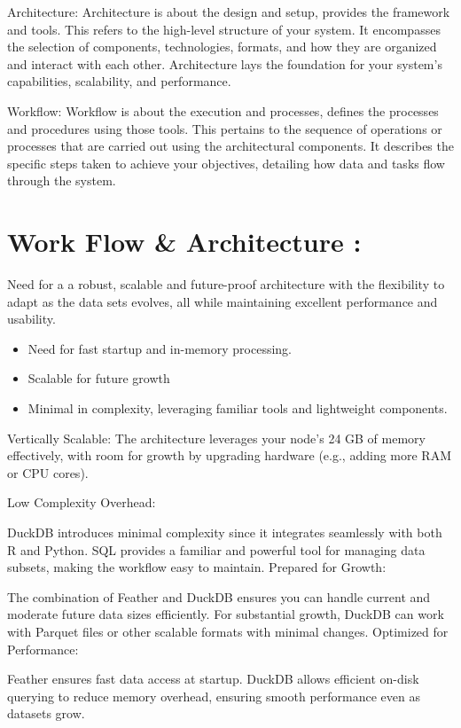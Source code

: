 \documentclass[
  american,
  10,
  a4paper,
]{book}
\providecommand{\tightlist}{%
  \setlength{\itemsep}{0pt}\setlength{\parskip}{0pt}}
\theoremstyle{definition}
\theoremstyle{remark}
\begin{document}
Architecture: Architecture is about the design and setup, provides the
framework and tools. This refers to the high-level structure of your
system. It encompasses the selection of components, technologies,
formats, and how they are organized and interact with each other.
Architecture lays the foundation for your system's capabilities,
scalability, and performance.

Workflow: Workflow is about the execution and processes, defines the
processes and procedures using those tools. This pertains to the
sequence of operations or processes that are carried out using the
architectural components. It describes the specific steps taken to
achieve your objectives, detailing how data and tasks flow through the
system.

\section{Work Flow \& Architecture :}\label{work-flow-architecture}

Need for a a robust, scalable and future-proof architecture with the
flexibility to adapt as the data sets evolves, all while maintaining
excellent performance and usability.

\begin{itemize}
\tightlist
\item
  Need for fast startup and in-memory processing.
\item
  Scalable for future growth
\item
  Minimal in complexity, leveraging familiar tools and lightweight
  components.
\end{itemize}

Vertically Scalable: The architecture leverages your node's 24 GB of
memory effectively, with room for growth by upgrading hardware (e.g.,
adding more RAM or CPU cores).

Low Complexity Overhead:

DuckDB introduces minimal complexity since it integrates seamlessly with
both R and Python. SQL provides a familiar and powerful tool for
managing data subsets, making the workflow easy to maintain. Prepared
for Growth:

The combination of Feather and DuckDB ensures you can handle current and
moderate future data sizes efficiently. For substantial growth, DuckDB
can work with Parquet files or other scalable formats with minimal
changes. Optimized for Performance:

Feather ensures fast data access at startup. DuckDB allows efficient
on-disk querying to reduce memory overhead, ensuring smooth performance
even as datasets grow.
\end{document}
